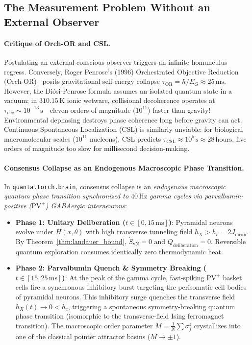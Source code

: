 \documentclass[10pt,twocolumn,3p]{article}
\begin{document}
\subsection{The Measurement Problem Without an External Observer}
\label{subsec:dial_measurement_problem}

\paragraph{Critique of Orch-OR and CSL.}
Postulating an external conscious observer triggers an infinite homunculus regress. Conversely, Roger Penrose's (1996) Orchestrated Objective Reduction (Orch-OR)~\cite{penrose1996,hameroff2014} posits gravitational self-energy collapse $\tau_{\text{OR}} = \hbar / E_G \approx 25\,\text{ms}$. However, the Di\'osi-Penrose formula assumes an isolated quantum state in a vacuum; in $310.15\,\text{K}$ ionic wetware, collisional decoherence operates at $\tau_{\text{dec}} \sim 10^{-13}\,\text{s}$---eleven orders of magnitude ($10^{11}$) faster than gravity! Environmental dephasing destroys phase coherence long before gravity can act. Continuous Spontaneous Localization (CSL) is similarly unviable: for biological macromolecular scales ($10^{11}$ nucleons), CSL predicts $\tau_{\text{CSL}} \approx 10^5\,\text{s} \approx 28\,\text{hours}$, five orders of magnitude too slow for millisecond decision-making.

\paragraph{Consensus Collapse as an Endogenous Macroscopic Phase Transition.}
In \texttt{quanta.torch.brain}, consensus collapse is an \textit{endogenous macroscopic quantum phase transition synchronized to $40\,\text{Hz}$ gamma cycles via parvalbumin-positive ($\text{PV}^+$) GABAergic interneurons}:
\begin{itemize}
    \item \textbf{Phase 1: Unitary Deliberation ($t \in [0, 15\,\text{ms}]$)}: Pyramidal neurons evolve under $H(x, \theta)$ with high transverse tunneling field $h_X > h_c = 2 J_{\text{mean}}$. By Theorem~\ref{thm:landauer_bound}, $\dot{S}_{\text{vN}} = 0$ and $Q_{\text{deliberation}} = 0$. Reversible quantum exploration consumes identically zero thermodynamic heat.
    \item \textbf{Phase 2: Parvalbumin Quench \& Symmetry Breaking ($t \in [15, 25\,\text{ms}]$)}: At the peak of the gamma cycle, fast-spiking $\text{PV}^+$ basket cells fire a synchronous inhibitory burst targeting the perisomatic cell bodies of pyramidal neurons. This inhibitory surge quenches the transverse field $h_X(t) \to 0 < h_c$, triggering a spontaneous symmetry-breaking quantum phase transition (isomorphic to the transverse-field Ising ferromagnet transition). The macroscopic order parameter $M = \frac{1}{N}\sum \sigma_j^z$ crystallizes into one of the classical pointer attractor basins ($M \to \pm 1$).
\end{itemize}
\end{document}
